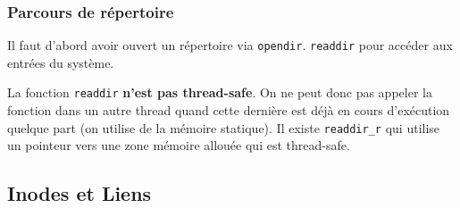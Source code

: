 \subsubsection{Parcours de répertoire}\label{parcours-de-ruxe9pertoire}

\begin{Shaded}
\begin{Highlighting}[]
\OperatorTok{\{} 
\OperatorTok{;}                
\OperatorTok{;}                 
     \OperatorTok{;}    
     \OperatorTok{;}       
    \OperatorTok{[}\OperatorTok{];}           
\OperatorTok{\};}
\end{Highlighting}
\end{Shaded}

Il faut d'abord avoir ouvert un répertoire via \texttt{opendir}.
\texttt{readdir} pour accéder aux entrées du système.

La fonction \texttt{readdir} \textbf{n'est pas thread-safe}. On ne peut
donc pas appeler la fonction dans un autre thread quand cette dernière
est déjà en cours d'exécution quelque part (on utilise de la mémoire
statique). Il existe \texttt{readdir\_r} qui utilise un pointeur vers
une zone mémoire allouée qui est thread-safe.

\begin{Shaded}
\begin{Highlighting}[]
\OperatorTok{(}\OperatorTok{*}\OperatorTok{,} \OperatorTok{*}\OperatorTok{,} \OperatorTok{**}\OperatorTok{);}
\end{Highlighting}
\end{Shaded}

\subsection{Inodes et Liens}\label{inodes-et-liens}

